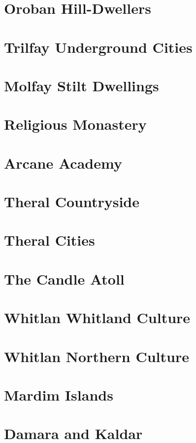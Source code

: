 \section{Oroban Hill-Dwellers}

\section{Trilfay Underground Cities}

\section{Molfay Stilt Dwellings}

\section{Religious Monastery}

\section{Arcane Academy}

\section{Theral Countryside}

\section{Theral Cities}

\section{The Candle Atoll}

\section{Whitlan Whitland Culture}

\section{Whitlan Northern Culture}

\section{Mardim Islands}

\section{Damara and Kaldar}

